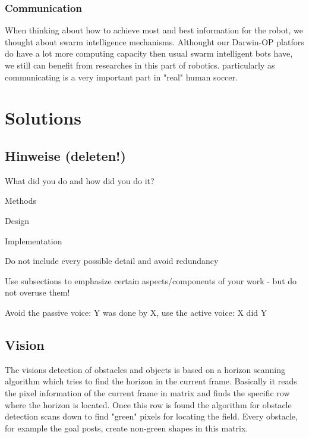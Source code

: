 \documentclass[lnicst,a4paper]{svmultln}
\begin{document}
\subsubsection{Communication}
When thinking about how to achieve most and best information for the robot, we thought about swarm intelligence mechanisms. Althought our Darwin-OP platfors do have a lot more computing capacity then usual swarm intelligent bots have, we still can benefit from researches in this part of robotics. particularly as communicating is a very important part in "real" human soccer.






\section{Solutions}


\subsection{Hinweise (deleten!)}
What did you do and how did you do it?

Methods

Design

Implementation

Do not include every possible detail and avoid redundancy

Use subsections to emphasize certain aspects/components of
your work -
but do not overuse them!

Avoid the passive voice: Y was done by X, use the active voice: X did Y





\subsection{Vision}
The visions detection of obstacles and objects is based on a horizon scanning algorithm which tries to find the horizon in the current frame. Basically it reads the pixel information of the current frame in matrix and finds the specific row where the horizon is located.
Once this row is found the algorithm for obstacle detection scans down to find "green" pixels for locating the field. Every obstacle, for example the goal posts, create non-green shapes in this matrix.
\\
\end{document}
